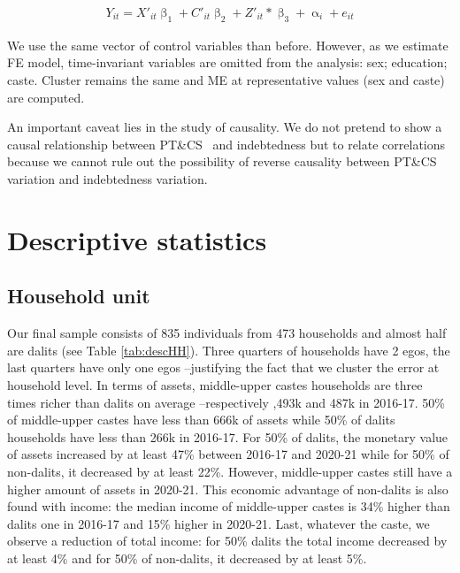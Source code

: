 \documentclass[a4paper, 12pt, onecolumn]{article}
\newcommand{\PTCS}{PT\&CS}
\begin{document}
\begin{equation}\label{eq:fe}
\begin{split}
Y_{it}=X'_{it}\upbeta_{1}+C'_{it}\upbeta_{2}+Z'_{it}*\upbeta_{3}+\upalpha_{i}+e_{it}
\end{split}
\end{equation}

We use the same vector of control variables than before.
However, as we estimate FE model, time-invariant variables are omitted from the analysis: sex; education; caste. 
Cluster remains the same and ME at representative values (sex and caste) are computed.

An important caveat lies in the study of causality.
We do not pretend to show a causal relationship between \PTCS~ and indebtedness but to relate correlations because we cannot rule out the possibility of reverse causality between \PTCS~ variation and indebtedness variation.



\section{Descriptive statistics}
\label{section:descstat}

	\subsection{Household unit}

Our final sample consists of 835 individuals from 473 households and almost half are dalits (see Table \ref{tab:descHH}).
Three quarters of households have 2 egos, the last quarters have only one egos --justifying the fact that we cluster the error at household level.
In terms of assets, middle-upper castes households are three times richer than dalits on average --respectively ,493k and \rupee487k in 2016-17.
50\% of middle-upper castes have less than \rupee666k of assets while 50\% of dalits households have less than \rupee266k in 2016-17.
For 50\% of dalits, the monetary value of assets increased by at least 47\% between 2016-17 and 2020-21 while for 50\% of non-dalits, it decreased by at least 22\%.
However, middle-upper castes still have a higher amount of assets in 2020-21.
This economic advantage of non-dalits is also found with income: the median income of middle-upper castes is 34\% higher than dalits one in 2016-17 and 15\% higher in 2020-21.
Last, whatever the caste, we observe a reduction of total income: for 50\% dalits the total income decreased by at least 4\% and for 50\% of non-dalits, it decreased by at least 5\%.
		
\end{document}
